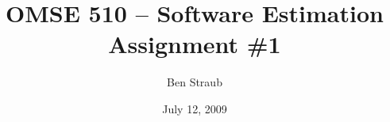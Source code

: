 \documentclass[11pt]{article}
\begin{document}
\title{OMSE 510 -- Software Estimation\\Assignment \#1}
\author{Ben Straub}
\date{July 12, 2009}
\maketitle


\end{document}
